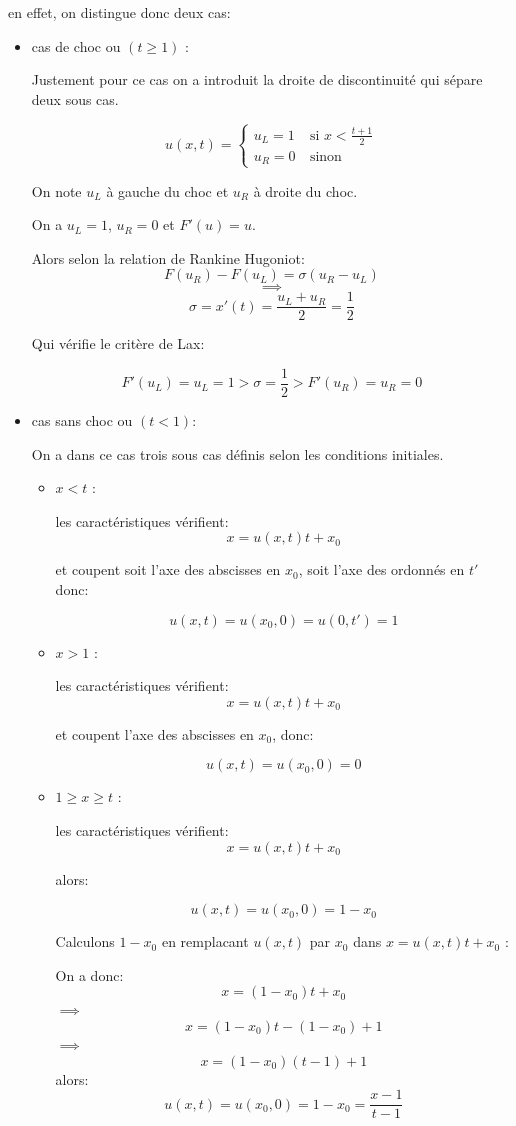 en effet, on distingue donc deux cas:
\begin{itemize}

\item cas de choc ou $(t \geq 1)$ : 

Justement pour ce cas on a introduit la droite de discontinuit\'e qui s\'epare deux sous cas.

\begin{equation}
\label{systeme}
u(x,t) =
\left \lbrace \begin{array}{rl}
u_L = 1 & ~\text{si }  x < \frac{t+1}{2}\\
u_R = 0 & ~\text{sinon }  
\end{array}\right.
\end{equation}

On note $u_L$ \`a gauche du choc et $u_R$ \`a droite du choc.

On a $u_L = 1$, $u_R = 0$ et $F'(u) = u$.

Alors selon la relation de Rankine Hugoniot:
$$F(u_R)-F(u_L) = \sigma (u_R-u_L)$$
$$\implies$$
$$\sigma = x'(t) =  \frac{u_L+u_R}{2} = \frac{1}{2}$$

Qui v\'erifie le crit\`ere de Lax:

$$F'(u_L) = u_L = 1 > \sigma = \frac{1}{2} > F'(u_R) = u_R = 0$$

\item  cas sans choc ou $(t < 1)$:

On a dans ce cas trois sous cas d\'efinis selon les conditions initiales.

\begin{itemize}

\item $x <  t$ : 

les caract\'eristiques v\'erifient:
$$x = u(x,t)t + x_0 $$

et coupent soit l'axe des abscisses en $x_0$, soit l'axe des ordonn\'es en $t'$ donc:

$$u(x,t) = u(x_0,0) = u(0,t') = 1$$


\item $x >  1$ : 

les caract\'eristiques v\'erifient:
$$x = u(x,t)t + x_0 $$

et coupent l'axe des abscisses en $x_0$, donc:

$$u(x,t) = u(x_0,0) = 0$$

\item $1 \geq x \geq t$ : 

les caract\'eristiques v\'erifient:
$$x = u(x,t)t + x_0 $$

alors:

$$u(x,t) = u(x_0,0) = 1-x_0$$

Calculons $1-x_0$ en remplacant $u(x,t)$ par $x_0$ dans $x = u(x,t)t + x_0 $ :

On a donc:
$$x = (1-x_0)t + x_0 $$
$\implies$
$$x = (1-x_0)t - (1-x_0) +  1$$
$\implies$
$$x = (1-x_0)(t-1) + 1$$
alors:
$$u(x,t) = u(x_0,0) = 1-x_0 = \frac{x-1}{t-1}$$

\end{itemize}
 

\end{itemize}

